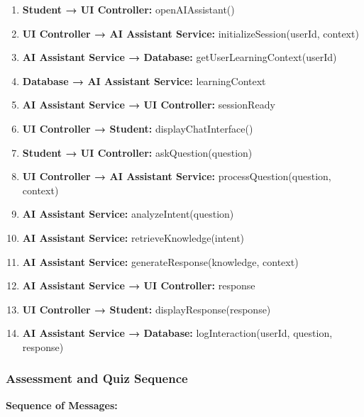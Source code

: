 \begin{enumerate}
    \item \textbf{Student → UI Controller:} openAIAssistant()
    \item \textbf{UI Controller → AI Assistant Service:} initializeSession(userId, context)
    \item \textbf{AI Assistant Service → Database:} getUserLearningContext(userId)
    \item \textbf{Database → AI Assistant Service:} learningContext
    \item \textbf{AI Assistant Service → UI Controller:} sessionReady
    \item \textbf{UI Controller → Student:} displayChatInterface()
    \item \textbf{Student → UI Controller:} askQuestion(question)
    \item \textbf{UI Controller → AI Assistant Service:} processQuestion(question, context)
    \item \textbf{AI Assistant Service:} analyzeIntent(question)
    \item \textbf{AI Assistant Service:} retrieveKnowledge(intent)
    \item \textbf{AI Assistant Service:} generateResponse(knowledge, context)
    \item \textbf{AI Assistant Service → UI Controller:} response
    \item \textbf{UI Controller → Student:} displayResponse(response)
    \item \textbf{AI Assistant Service → Database:} logInteraction(userId, question, response)
\end{enumerate}

\subsubsection{Assessment and Quiz Sequence}

\textbf{Sequence of Messages:}

